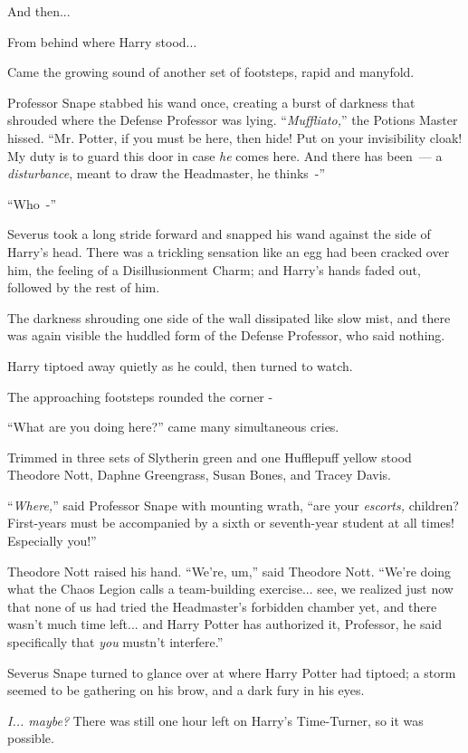 And then...

From behind where Harry stood...

Came the growing sound of another set of footsteps, rapid and manyfold.

Professor Snape stabbed his wand once, creating a burst of darkness that shrouded where the Defense Professor was lying. ``\emph{Muffliato,}'' the Potions Master hissed. ``Mr. Potter, if you must be here, then hide! Put on your invisibility cloak! My duty is to guard this door in case \emph{he} comes here. And there has been~--- a \emph{disturbance}, meant to draw the Headmaster, he thinks~-''

``Who~-''

Severus took a long stride forward and snapped his wand against the side of Harry's head. There was a trickling sensation like an egg had been cracked over him, the feeling of a Disillusionment Charm; and Harry's hands faded out, followed by the rest of him.

The darkness shrouding one side of the wall dissipated like slow mist, and there was again visible the huddled form of the Defense Professor, who said nothing.

Harry tiptoed away quietly as he could, then turned to watch.

The approaching footsteps rounded the corner -

``What are you doing here?'' came many simultaneous cries.

Trimmed in three sets of Slytherin green and one Hufflepuff yellow stood Theodore Nott, Daphne Greengrass, Susan Bones, and Tracey Davis.

``\emph{Where,}'' said Professor Snape with mounting wrath, ``are your \emph{escorts,} children? First-years must be accompanied by a sixth or seventh-year student at all times! Especially you!''

Theodore Nott raised his hand. ``We're, um,'' said Theodore Nott. ``We're doing what the Chaos Legion calls a team-building exercise... see, we realized just now that none of us had tried the Headmaster's forbidden chamber yet, and there wasn't much time left... and Harry Potter has authorized it, Professor, he said specifically that \emph{you} mustn't interfere.''

Severus Snape turned to glance over at where Harry Potter had tiptoed; a storm seemed to be gathering on his brow, and a dark fury in his eyes.

\emph{I... maybe?} There was still one hour left on Harry's Time-Turner, so it was possible.

